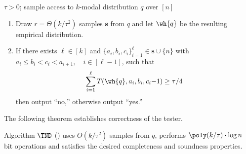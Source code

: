 \begin{algorithm}
\medskip
{} $\tau > 0$; sample access to $k$-modal
distribution $q$ over $[n]$

\begin{enumerate}

\item {Draw $r = \Theta(k/\tau^2)$} samples
$\mathbf{s}$ from $q$ and let $\wh{q}$ be the resulting
empirical distribution.

%


\item If there exists $\ell \in [k]$ and $\{a_i, b_i,
    c_i\}_{i=1}^{\ell} \in  \mathbf{s} \cup \{n\}$ with $a_i \le b_i <
    c_i < a_{i+1},\quad i \in [\ell-1]$, such that
\begin{equation} \label{eqn:estimator}
\sum_{i=1}^{\ell} T(\wh{q}, a_i, b_i, c_i  {-1}) \ge \tau/4
\end{equation}
then output ``no,'' otherwise output ``yes.''
\end{enumerate}
\caption{}\label{alg:tester-up}
\end{algorithm}


The following theorem establishes correctness of the tester.

\begin{theorem} \label{thm:tester-correctness}
%
Algorithm
$\TND$ () uses {$O(k/\tau^2)$} samples from $q$, performs $\poly(k/\tau) \cdot \log n$ bit operations and satisfies the desired completeness and soundness properties.
\end{theorem}

